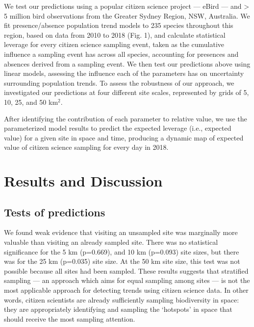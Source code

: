 \documentclass[9pt,twocolumn,twoside,lineno]{pnas-new}
\begin{document}
We test our predictions using a popular citizen science project --- eBird \cite{sullivan2009ebird} --- and > 5 million bird observations from the Greater Sydney Region, NSW, Australia. We fit presence/absence population trend models to 235 species throughout this region, based on data from 2010 to 2018 (Fig. 1), and calculate statistical leverage for every citizen science sampling event, taken as the cumulative influence a sampling event has across all species, accounting for presences and absences derived from a sampling event. We then test our predictions above using linear models, assessing the influence each of the parameters has on uncertainty surrounding population trends. To assess the robustness of our approach, we investigated our predictions at four different site scales, represented by grids of 5, 10, 25, and 50 km$^{2}$. 

After identifying the contribution of each parameter to relative value, we use the parameterized model results to predict the expected leverage (i.e., expected value) for a given site in space and time, producing a dynamic map of expected value of citizen science sampling for every day in 2018.

\section*{Results and Discussion}
\subsection*{Tests of predictions}
We found weak evidence that visiting an unsampled site was marginally more valuable than visiting an already sampled site. There was no statistical significance for the 5 km (p=0.669), and 10 km (p=0.093) site sizes, but there was for the 25 km (p=0.035) site size. At the 50 km site size, this test was not possible because all sites had been sampled. These results suggests that stratified sampling --- an approach which aims for equal sampling among sites --- \cite{baillie2008toward, longino1997biodiversity} is not the most applicable approach for detecting trends using citizen science data. In other words, citizen scientists are already sufficiently sampling biodiversity in space: they are appropriately identifying and sampling the `hotspots' in space that should receive the most sampling attention.
\end{document}
